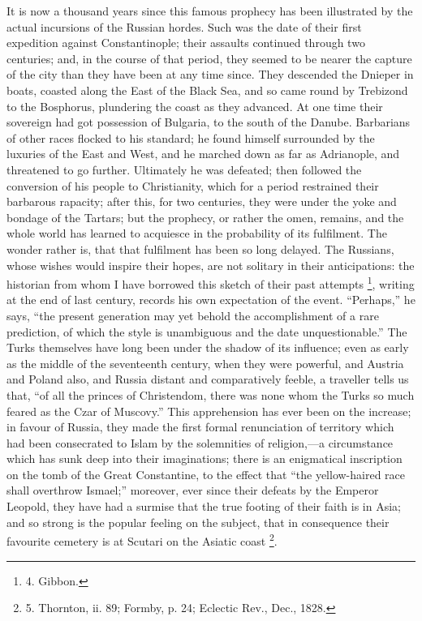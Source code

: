 It is now a thousand years
since this famous prophecy has been illustrated by the actual
incursions of the Russian hordes. Such was the date of their first
expedition against Constantinople; their assaults continued through
two centuries; and, in the course of that period, they seemed to be
nearer the capture of the city than they have been at any time since.
They descended the Dnieper in boats, coasted along the East of the
Black Sea, and so came round by Trebizond to the Bosphorus, plundering
the coast as they advanced. At one time their sovereign had got
possession of Bulgaria, to the south of the Danube. Barbarians of
other races flocked to his standard; he found himself surrounded by
the luxuries of the East and West, and he marched down as far as
Adrianople, and threatened to go further. Ultimately he was defeated;
then followed the conversion of his people to Christianity,
which for a period restrained their barbarous rapacity; after this,
for two centuries, they were under the yoke and bondage of the
Tartars; but the prophecy, or rather the omen, remains, and the whole
world has learned to acquiesce in the probability of its fulfilment.
The wonder rather is, that that fulfilment has been so long delayed.
The Russians, whose wishes would inspire their hopes, are not solitary
in their anticipations: the historian from whom I have borrowed this
sketch of their past attempts \footnote{4.
Gibbon.},
writing at the end of last century, records his own expectation of the
event. ``Perhaps,'' he says, ``the present generation may yet behold the
accomplishment of a rare prediction, of which the style is unambiguous
and the date unquestionable.'' The Turks themselves have long been
under the shadow of its influence; even as early as the middle of the
seventeenth century, when they were powerful, and Austria and Poland
also, and Russia distant and comparatively feeble, a traveller tells
us that, ``of all the princes of Christendom, there was none whom the
Turks so much feared as the Czar of Muscovy.'' This apprehension has
ever been on the increase; in favour of Russia, they made the first
formal renunciation of territory which had been consecrated to Islam
by the solemnities of religion,—a circumstance which has sunk deep
into their imaginations; there is an enigmatical inscription on the
tomb of the Great Constantine, to the effect that ``the yellow-haired
race shall overthrow Ismael;'' moreover, ever since their defeats by
the Emperor Leopold, they have had a surmise that the true footing of
their faith is in Asia; and so strong is the popular feeling on the
subject, that in consequence their favourite cemetery is at Scutari on
the Asiatic coast \footnote{5.
Thornton, ii. 89; Formby, p. 24; Eclectic Rev., Dec., 1828.}.

